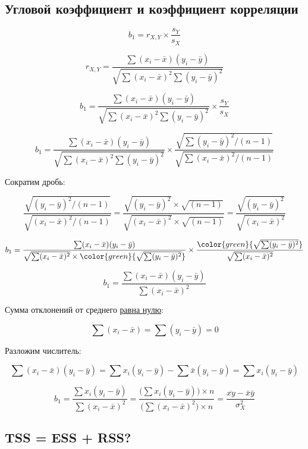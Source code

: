 \documentclass[
  letterpaper,
]{scrbook}
\theoremstyle{definition}
\theoremstyle{remark}
\begin{document}
\subsection{Угловой коэффициент и коэффициент
корреляции}\label{ux443ux433ux43bux43eux432ux43eux439-ux43aux43eux44dux444ux444ux438ux446ux438ux435ux43dux442-ux438-ux43aux43eux44dux444ux444ux438ux446ux438ux435ux43dux442-ux43aux43eux440ux440ux435ux43bux44fux446ux438ux438}

\[
b_1 = r_{X,Y} \times \frac{s_Y}{s_X}
\]

\[
r_{X,Y} = \frac{\sum (x_i - \bar x)(y_i - \bar y)}{\sqrt{\sum(x_i - \bar x)^2 \sum(y_i - \bar y)^2}}
\]

\[
b_1 = \frac{\sum (x_i - \bar x)(y_i - \bar y)}{\sqrt{\sum(x_i - \bar x)^2 \sum(y_i - \bar y)^2}}
\times
\frac{s_Y}{s_X}
\]

\[
b_1 = \frac{\sum (x_i - \bar x)(y_i - \bar y)}{\sqrt{\sum(x_i - \bar x)^2 \sum(y_i - \bar y)^2}}
\times
\frac{\sqrt{\sum (y_i - \bar y)^2 / (n-1)}}{\sqrt{\sum (x_i - \bar x)^2 / (n-1)}}
\]

Сократим дробь:

\[
\frac{\sqrt{(y_i - \bar y)^2 / (n-1)}}{\sqrt{(x_i - \bar x)^2 / (n-1)}} = 
\frac{\sqrt{(y_i - \bar y)^2} \times \sqrt{(n-1)}}{\sqrt{(x_i - \bar x)^2} \times \sqrt{(n-1)}} = \frac{\sqrt{(y_i - \bar y)^2}}{\sqrt{(x_i - \bar x)^2}}
\]

\[
b_1 = \frac{\sum (x_i - \bar x)(y_i - \bar y)}{\sqrt{\sum(x_i - \bar x)^2} \times \color{green}{\sqrt{\sum(y_i - \bar y)^2}}}
\times
\frac{\color{green}{\sqrt{\sum(y_i - \bar y)^2}}}{\sqrt{\sum(x_i - \bar x)^2}}
\]

\[
b_1 = \frac{\sum (x_i - \bar x)(y_i - \bar y)}{\sum(x_i - \bar x)^2}
\]

Сумма отклонений от среднего \href{}{равна нулю}:

\[
\sum(x_i - \bar x) = \sum (y_i - \bar y) = 0
\]

Разложим числитель:

\[
\sum (x_i - \bar x) (y_i - \bar y) = 
\sum x_i (y_i - \bar y) - \sum \bar x (y_i - \bar y) = 
\sum x_i (y_i - \bar y)
\]

\[
b_1 = \frac{\sum x_i (y_i - \bar y)}{\sum (x_i - \bar x)^2} = 
\frac{\Big( \sum x_i (y_i - \bar y) \Big) \times n}{\Big( \sum (x_i - \bar x)^2 \Big) \times n} = \frac{\overline{xy} - \bar x \bar y}{\sigma_X^2}
\]

\subsection{TSS = ESS + RSS?}\label{tss-ess-rss}
\end{document}
